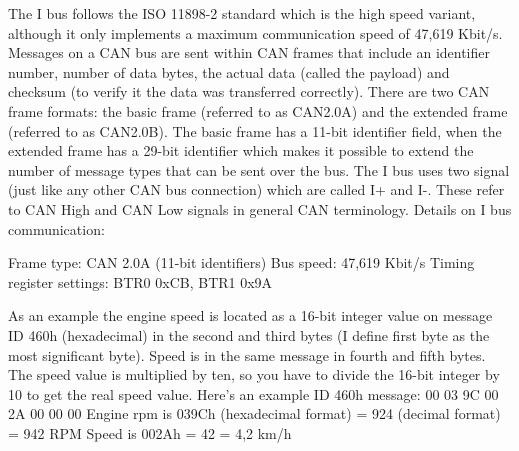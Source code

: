\documentclass[11pt,a4paper]{book}
\begin{document}
The I bus follows the ISO 11898-2 standard which is the high speed variant, although it only
implements a maximum communication speed of 47,619 Kbit/s. Messages on a CAN bus are sent
within CAN frames that include an identifier number, number of data bytes, the actual data (called the
payload) and checksum (to verify it the data was transferred correctly). There are two CAN frame
formats: the basic frame (referred to as CAN2.0A) and the extended frame (referred to as CAN2.0B).
The basic frame has a 11-bit identifier field, when the extended frame has a 29-bit identifier which
makes it possible to extend the number of message types that can be sent over the bus.
The I bus uses two signal (just like any other CAN bus connection) which are called I+ and I-. These
refer to CAN High and CAN Low signals in general CAN terminology.
Details on I bus communication:

Frame type: CAN 2.0A (11-bit identifiers)
Bus speed: 47,619 Kbit/s
Timing register settings: BTR0 0xCB, BTR1 0x9A

As an example the engine speed is located as a 16-bit integer value on message ID 460h
(hexadecimal) in the second and third bytes (I define first byte as the most significant byte). Speed is
in the same message in fourth and fifth bytes. The speed value is multiplied by ten, so you have to
divide the 16-bit integer by 10 to get the real speed value.
Here's an example ID 460h message: 00 03 9C 00 2A 00 00 00
Engine rpm is 039Ch (hexadecimal format) = 924 (decimal format) = 942 RPM
Speed is 002Ah = 42 = 4,2 km/h
\end{document}

